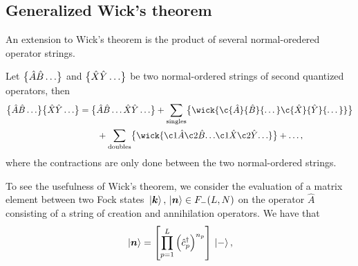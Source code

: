         \subsection{Generalized Wick's theorem}
            An extension to Wick's theorem is the product of several
            normal-oredered operator strings.
            \begin{theorem}
                \label{theorem:wick-general}
                Let $\normalord{\hat{A}\hat{B}\dots}$ and
                $\normalord{\hat{X}\hat{Y}\dots}$ be two normal-ordered strings of
                second quantized operators, then
                \begin{align}
                    \normalord{\hat{A}\hat{B}\dots}
                    \normalord{\hat{X}\hat{Y}\dots}
                    &= \normalord{\hat{A}\hat{B}\dots\hat{X}\hat{Y}\dots}
                    + \sum_{\text{singles}}
                    \normalord{
                        \wick{
                            \c {\hat{A}}
                            {\hat{B}}
                            {\dots}
                            \c {\hat{X}}
                            {\hat{Y}}
                            {\dots}
                        }
                    }
                    \nonumber \\
                    &\qquad
                    + \sum_{\text{doubles}}
                    \normalord{
                        \wick{
                            \c1 {\hat{A}}
                            \c2 {\hat{B}}
                            {\dots}
                            \c1 {\hat{X}}
                            \c2 {\hat{Y}}
                            {\dots}
                        }
                    }
                    + \dots,
                \end{align}
                where the contractions are only done between the two
                normal-ordered strings.
            \end{theorem}
            To see the usefulness of Wick's theorem, we consider the evaluation
            of a matrix element between two Fock states $\ket*{\boldsymbol{k}},
            \ket*{\boldsymbol{n}} \in F_{-}(L, N)$ on the operator $\hat{A}$ consisting
            of a string of creation and annihilation operators.
            We have that
            \begin{align}
                \ket*{\boldsymbol{n}}
                = \left[ 
                    \prod_{p = 1}^{L}\left( 
                        \hat{c}_{p}^{\dagger}
                     \right)^{n_p}
                 \right]\ket*{-},
            \end{align}
